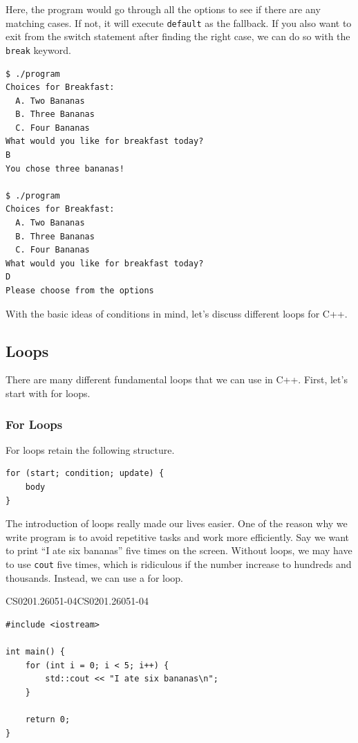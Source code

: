 \documentclass[../../../main.tex]{subfiles}
\begin{document}
Here, the program would go through all the options to see
if there are any matching cases. If not, it will execute
\verb|default| as the fallback. If you also want to exit from the
switch statement after finding the right case, we can do so
with the \verb|break| keyword.

\begin{outputbox}
\begin{lstlisting}[style=basic]
$ ./program
Choices for Breakfast:
  A. Two Bananas
  B. Three Bananas
  C. Four Bananas
What would you like for breakfast today?
B
You chose three bananas!

$ ./program
Choices for Breakfast:
  A. Two Bananas
  B. Three Bananas
  C. Four Bananas
What would you like for breakfast today?
D
Please choose from the options
\end{lstlisting}
\end{outputbox}

With the basic ideas of conditions in mind, let's discuss different
loops for C++.

\subsection{Loops}

There are many different fundamental loops that we can use in C++.
First, let's start with for loops.

\subsubsection{For Loops}

For loops retain the following structure.

\begin{basicbox}
\begin{lstlisting}[style=basic]
for (start; condition; update) {
    body
}
\end{lstlisting}
\end{basicbox}

The introduction of loops really made our lives easier. One of the
reason why we write program is to avoid repetitive tasks and work
more efficiently. Say we want to print ``I ate six bananas'' five
times on the screen. Without loops, we may have to use \verb|cout|
five times, which is ridiculous if the number increase to hundreds
and thousands. Instead, we can use a for loop.

\begin{cppbox}{CS0201.26051-04}{CS0201.26051-04}
\begin{lstlisting}[style=cppstyle]
#include <iostream>

int main() {
    for (int i = 0; i < 5; i++) {
        std::cout << "I ate six bananas\n";
    }

    return 0;
}
\end{lstlisting}
\end{cppbox}
\end{document}
